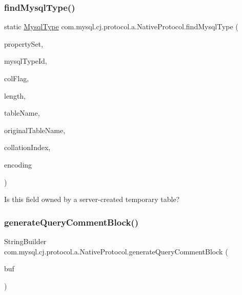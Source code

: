 \subsubsection{\texorpdfstring{find\+Mysql\+Type()}{findMysqlType()}}
{\footnotesize\ttfamily static \mbox{\hyperlink{enumcom_1_1mysql_1_1cj_1_1_mysql_type}{Mysql\+Type}} com.\+mysql.\+cj.\+protocol.\+a.\+Native\+Protocol.\+find\+Mysql\+Type (\begin{DoxyParamCaption}\item[{\mbox{\hyperlink{interfacecom_1_1mysql_1_1cj_1_1conf_1_1_property_set}{Property\+Set}}}]{property\+Set,  }\item[{int}]{mysql\+Type\+Id,  }\item[{short}]{col\+Flag,  }\item[{long}]{length,  }\item[{\mbox{\hyperlink{classcom_1_1mysql_1_1cj_1_1util_1_1_lazy_string}{Lazy\+String}}}]{table\+Name,  }\item[{\mbox{\hyperlink{classcom_1_1mysql_1_1cj_1_1util_1_1_lazy_string}{Lazy\+String}}}]{original\+Table\+Name,  }\item[{int}]{collation\+Index,  }\item[{String}]{encoding }\end{DoxyParamCaption})\hspace{0.3cm}{\ttfamily [static]}}

Is this field owned by a server-\/created temporary table?\mbox{\label{classcom_1_1mysql_1_1cj_1_1protocol_1_1a_1_1_native_protocol_afae13c03a8e5589e8cf316f7f797b159}} 
\subsubsection{\texorpdfstring{generate\+Query\+Comment\+Block()}{generateQueryCommentBlock()}}
{\footnotesize\ttfamily String\+Builder com.\+mysql.\+cj.\+protocol.\+a.\+Native\+Protocol.\+generate\+Query\+Comment\+Block (\begin{DoxyParamCaption}\item[{String\+Builder}]{buf }\end{DoxyParamCaption})}

